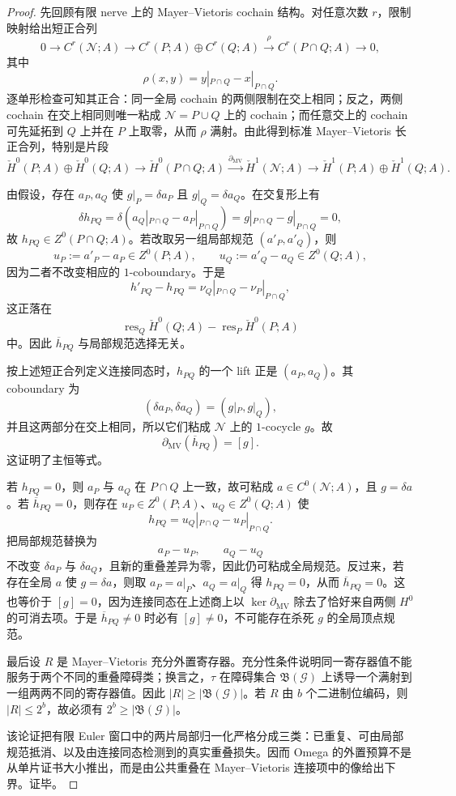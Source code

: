 \begin{proof}
先回顾有限 nerve 上的 Mayer--Vietoris cochain 结构。对任意次数 \(r\)，限制映射给出短正合列
\[
0\longrightarrow C^r(\mathcal N;A)
\longrightarrow C^r(P;A)\oplus C^r(Q;A)
\overset{\rho}{\longrightarrow} C^r(P\cap Q;A)
\longrightarrow0,
\]
其中
\[
\rho(x,y)=y|_{P\cap Q}-x|_{P\cap Q}.
\]
逐单形检查可知其正合：同一全局 cochain 的两侧限制在交上相同；反之，两侧 cochain 在交上相同则唯一粘成 \(\mathcal N=P\cup Q\) 上的 cochain；而任意交上的 cochain 可先延拓到 \(Q\) 上并在 \(P\) 上取零，从而 \(\rho\) 满射。由此得到标准 Mayer--Vietoris 长正合列，特别是片段
\[
\check H^0(P;A)\oplus\check H^0(Q;A)
\longrightarrow
\check H^0(P\cap Q;A)
\overset{\partial_{\mathrm{MV}}}{\longrightarrow}
\check H^1(\mathcal N;A)
\longrightarrow
\check H^1(P;A)\oplus\check H^1(Q;A).
\]

由假设，存在 \(a_P,a_Q\) 使 \(g|_P=\delta a_P\) 且 \(g|_Q=\delta a_Q\)。在交复形上有
\[
\delta h_{PQ}
=\delta(a_Q|_{P\cap Q}-a_P|_{P\cap Q})
=g|_{P\cap Q}-g|_{P\cap Q}=0,
\]
故 \(h_{PQ}\in Z^0(P\cap Q;A)\)。若改取另一组局部规范 \((a'_P,a'_Q)\)，则
\[
u_P:=a'_P-a_P\in Z^0(P;A),
\qquad
u_Q:=a'_Q-a_Q\in Z^0(Q;A),
\]
因为二者不改变相应的 \(1\)-coboundary。于是
\[
h'_{PQ}-h_{PQ}
=\nu_Q|_{P\cap Q}-\nu_P|_{P\cap Q},
\]
这正落在
\[
\operatorname{res}_Q\check H^0(Q;A)-
\operatorname{res}_P\check H^0(P;A)
\]
中。因此 \(\overline h_{PQ}\) 与局部规范选择无关。

按上述短正合列定义连接同态时，\(h_{PQ}\) 的一个 lift 正是 \((a_P,a_Q)\)。其 coboundary 为
\[
(\delta a_P,\delta a_Q)=(g|_P,g|_Q),
\]
并且这两部分在交上相同，所以它们粘成 \(\mathcal N\) 上的 \(1\)-cocycle \(g\)。故
\[
\partial_{\mathrm{MV}}(\overline h_{PQ})=[g].
\]
这证明了主恒等式。

若 \(h_{PQ}=0\)，则 \(a_P\) 与 \(a_Q\) 在 \(P\cap Q\) 上一致，故可粘成 \(a\in C^0(\mathcal N;A)\)，且 \(g=\delta a\)。若 \(\overline h_{PQ}=0\)，则存在 \(u_P\in Z^0(P;A)\)、\(u_Q\in Z^0(Q;A)\) 使
\[
h_{PQ}=u_Q|_{P\cap Q}-u_P|_{P\cap Q}.
\]
把局部规范替换为
\[
a_P-u_P,\qquad a_Q-u_Q
\]
不改变 \(\delta a_P\) 与 \(\delta a_Q\)，且新的重叠差异为零，因此仍可粘成全局规范。反过来，若存在全局 \(a\) 使 \(g=\delta a\)，则取 \(a_P=a|_P\)、\(a_Q=a|_Q\) 得 \(h_{PQ}=0\)，从而 \(\overline h_{PQ}=0\)。这也等价于 \([g]=0\)，因为连接同态在上述商上以 \(\ker\partial_{\mathrm{MV}}\) 除去了恰好来自两侧 \(H^0\) 的可消去项。于是 \(\overline h_{PQ}\ne0\) 时必有 \([g]\ne0\)，不可能存在杀死 \(g\) 的全局顶点规范。

最后设 \(R\) 是 Mayer--Vietoris 充分外置寄存器。充分性条件说明同一寄存器值不能服务于两个不同的重叠障碍类；换言之，\(\tau\) 在障碍集合 \(\mathfrak B(\mathscr G)\) 上诱导一个满射到一组两两不同的寄存器值。因此 \(|R|\ge |\mathfrak B(\mathscr G)|\)。若 \(R\) 由 \(b\) 个二进制位编码，则 \(|R|\le2^b\)，故必须有 \(2^b\ge |\mathfrak B(\mathscr G)|\)。

该论证把有限 Euler 窗口中的两片局部归一化严格分成三类：已重复、可由局部规范抵消、以及由连接同态检测到的真实重叠损失。因而 Omega 的外置预算不是从单片证书大小推出，而是由公共重叠在 Mayer--Vietoris 连接项中的像给出下界。证毕。
\end{proof}


